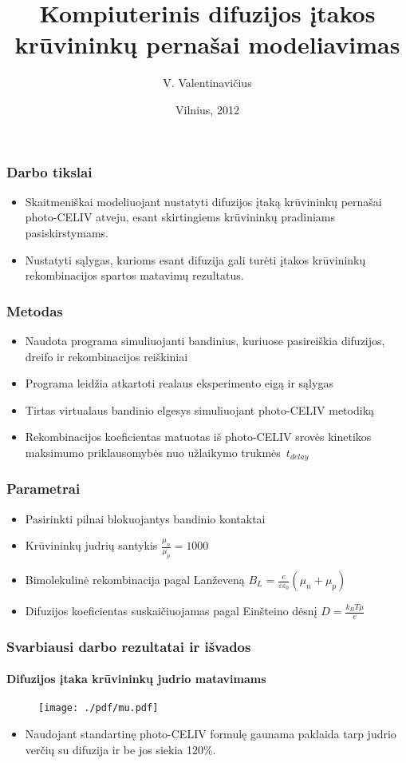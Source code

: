 \documentclass{beamer}
\title{Kompiuterinis difuzijos įtakos krūvininkų pernašai modeliavimas}
\author
{V. Valentinavičius}
\date{Vilnius, 2012}
\begin{document}
\frame{\titlepage}
  \begin{frame}
    \frametitle{Darbo tikslai}
    \begin{itemize}
      \item Skaitmeniškai modeliuojant nustatyti difuzijos įtaką krūvininkų pernašai photo-CELIV atveju, esant skirtingiems krūvininkų pradiniams pasiskirstymams.
      \item Nustatyti sąlygas, kurioms esant difuzija gali turėti įtakos krūvininkų rekombinacijos spartos matavimų rezultatus.
    \end{itemize}
  \end{frame}
  \begin{frame}
    \frametitle{Metodas}
    \begin{itemize}
	\item Naudota programa simuliuojanti bandinius, kuriuose pasireiškia difuzijos, dreifo ir rekombinacijos reiškiniai
	\item Programa leidžia atkartoti realaus eksperimento eigą ir sąlygas 
	\item Tirtas virtualaus bandinio elgesys simuliuojant photo-CELIV metodiką
	\item Rekombinacijos koeficientas matuotas iš photo-CELIV srovės kinetikos maksimumo priklausomybės nuo užlaikymo trukmės~\(t_{delay}\)
	\end{itemize}        
  \end{frame}
  \begin{frame}
    \frametitle{Parametrai}
    \begin{itemize}
    \item Pasirinkti pilnai blokuojantys bandinio kontaktai
	\item Krūvininkų judrių santykis \(\frac{\mu_n}{\mu_p} = 1000\)
	\item Bimolekulinė rekombinacija pagal Lanževeną \(B_L=\frac{e}{\varepsilon \varepsilon_0}(\mu_n+\mu_p)\)
	\item Difuzijos koeficientas suskaičiuojamas pagal Einšteino dėsnį \(D=\frac{k_B T \mu }{e}\)
	\end{itemize}
  \end{frame}
  \begin{frame}
    \frametitle{Svarbiausi darbo rezultatai ir išvados}
    \framesubtitle{Difuzijos įtaka krūvininkų judrio matavimams}
    \begin{figure}
    	\texttt{[image: ./pdf/mu.pdf]}
    \end{figure}
    \begin{itemize}
      \item Naudojant standartinę photo-CELIV formulę gaunama paklaida tarp judrio verčių su difuzija ir be jos siekia 120\%.
    \end{itemize}
  \end{frame}
\end{document}
